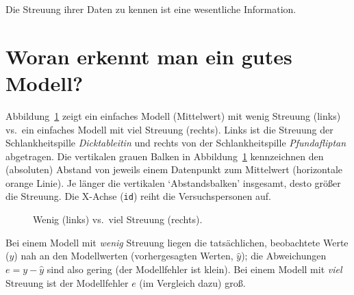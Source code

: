 \documentclass[
  letterpaper,
]{scrbook}
\theoremstyle{definition}
\theoremstyle{definition}
\theoremstyle{definition}
\theoremstyle{remark}
\begin{document}
Die Streuung ihrer Daten zu kennen ist eine wesentliche Information.

\section{Woran erkennt man ein gutes
Modell?}\label{woran-erkennt-man-ein-gutes-modell}

Abbildung~\ref{fig-streuung} zeigt ein einfaches Modell (Mittelwert) mit
wenig Streuung (links) vs.~ein einfaches Modell mit viel Streuung
(rechts). Links ist die Streuung der Schlankheitspille
\emph{Dicktableitin} und rechts von der Schlankheitspille
\emph{Pfundafliptan} abgetragen. Die vertikalen grauen Balken in
Abbildung~\ref{fig-streuung} kennzeichnen den (absoluten) Abstand von
jeweils einem Datenpunkt zum Mittelwert (horizontale orange Linie). Je
länger die vertikalen \enquote*{Abstandsbalken} insgesamt, desto größer
die Streuung. Die X-Achse (\texttt{id}) reiht die Versuchspersonen auf.

\begin{figure}


\caption{\label{fig-streuung}Wenig (links) vs.~viel Streuung (rechts).}

\end{figure}%

Bei einem Modell mit \emph{wenig} Streuung liegen die tatsächlichen,
beobachtete Werte (\(y\)) nah an den Modellwerten (vorhergesagten
Werten, \(\hat{y}\)); die Abweichungen \(e = y - \hat{y}\) sind also
gering (der Modellfehler ist klein). Bei einem Modell mit \emph{viel}
Streuung ist der Modellfehler \(e\) (im Vergleich dazu) groß.
\end{document}
